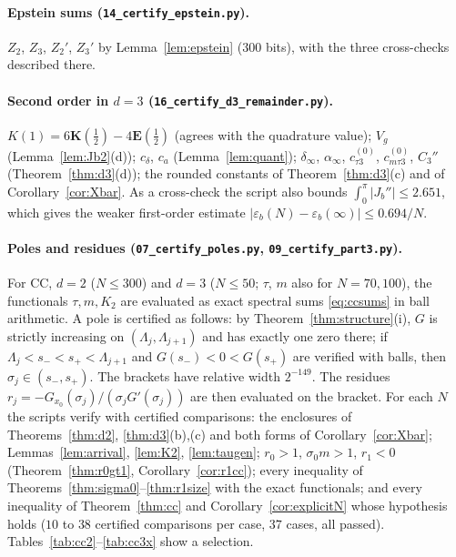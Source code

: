 \documentclass[11pt,a4paper]{article}
\theoremstyle{plain}
\theoremstyle{definition}
\numberwithin{equation}{section}
\begin{document}
\paragraph{Epstein sums (\texttt{14\_certify\_epstein.py}).} $Z_2$, $Z_3$, $Z_2'$, $Z_3'$ by Lemma~\ref{lem:epstein} ($300$ bits), with the three cross-checks described there.

\paragraph{Second order in $d=3$ (\texttt{16\_certify\_d3\_remainder.py}).} $K(1)=6\mathbf K(\frac12)-4\mathbf E(\frac12)$ (agrees with the quadrature value); $V_g$ (Lemma~\ref{lem:Jb2}(d)); $c_\delta$, $c_a$ (Lemma~\ref{lem:quant}); $\delta_\infty$, $\alpha_\infty$, $c^{(0)}_{\tau3}$, $c^{(0)}_{m\tau3}$, $C_3''$ (Theorem~\ref{thm:d3}(d)); the rounded constants of Theorem~\ref{thm:d3}(c) and of Corollary~\ref{cor:Xbar}. As a cross-check the script also bounds $\int_0^\pi|J_b''|\le2.651$, which gives the weaker first-order estimate $|\varepsilon_b(N)-\varepsilon_b(\infty)|\le0.694/N$.

\paragraph{Poles and residues (\texttt{07\_certify\_poles.py}, \texttt{09\_certify\_part3.py}).}
For CC, $d=2$ ($N\le300$) and $d=3$ ($N\le50$; $\tau$, $m$ also for $N=70,100$), the functionals $\tau,m,K_2$ are evaluated as exact spectral sums \eqref{eq:ccsums} in ball arithmetic. A pole is certified as follows: by Theorem~\ref{thm:structure}(i), $G$ is strictly increasing on $(\Lambda_j,\Lambda_{j+1})$ and has exactly one zero there; if $\Lambda_j<s_-<s_+<\Lambda_{j+1}$ and $G(s_-)<0<G(s_+)$ are verified with balls, then $\sigma_j\in(s_-,s_+)$. The brackets have relative width $2^{-149}$. The residues $r_j=-G_{x_0}(\sigma_j)/(\sigma_jG'(\sigma_j))$ are then evaluated on the bracket. For each $N$ the scripts verify with certified comparisons: the enclosures of Theorems~\ref{thm:d2}, \ref{thm:d3}(b),(c) and both forms of Corollary~\ref{cor:Xbar}; Lemmas~\ref{lem:arrival}, \ref{lem:K2}, \ref{lem:taugen}; $r_0>1$, $\sigma_0m>1$, $r_1<0$ (Theorem~\ref{thm:r0gt1}, Corollary~\ref{cor:r1cc}); every inequality of Theorems~\ref{thm:sigma0}--\ref{thm:r1size} with the exact functionals; and every inequality of Theorem~\ref{thm:cc} and Corollary~\ref{cor:explicitN} whose hypothesis holds ($10$ to $38$ certified comparisons per case, $37$ cases, all passed). Tables~\ref{tab:cc2}--\ref{tab:cc3x} show a selection.
\end{document}
